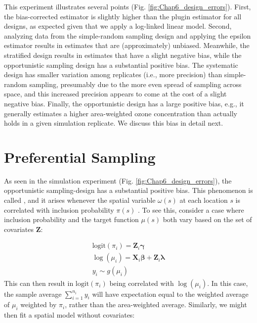 This experiment illustrates several points (Fig. \ref{fig:Chap6_design_errors}).  First, the bias-corrected estimator is slightly higher than the plugin estimator for all designs, as expected given that we apply a log-linked linear model.  Second, analyzing data from the simple-random sampling design and applying the epsilon estimator results in estimates that are (approximately) unbiased. Meanwhile, the stratified design results in estimates that have a slight negative bias, while the opportunistic sampling design has a substantial positive bias.  The systematic design has smaller variation among replicates (i.e., more precision) than simple-random sampling, presumably due to the more even spread of sampling across space, and this increased precision appears to come at the cost of a slight negative bias.   Finally, the opportunistic design has a large positive bias, e.g., it generally estimates a higher area-weighted ozone concentration than actually holds in a given simulation replicate.  We discuss this bias in detail next.  

\section{Preferential Sampling} \label{sec:Chap6_preferential_sampling}

As seen in the simulation experiment (Fig. \ref{fig:Chap6_design_errors}), the opportunistic sampling-design has a substantial positive bias.  This phenomenon is called , and it arises whenever the spatial variable \( \omega(s) \) at each location \(s\) is correlated with inclusion probability \( \pi(s) \) \cite{ conn_confronting_2017,diggle_model-based_2007}.  To see this, consider a case where inclusion probability and the target function \( \mu(s) \) both vary based on the set of covariates \(\mathbf Z\):

\begin{equation} \label{eq:Chap6_preferential_sampling}
\begin{gathered}
    \mathrm{logit}(\pi_i) = \mathbf Z_i \mathbf \gamma \\
    \log(\mu_i) = \mathbf X_i \mathbf \beta + \mathbf Z_i \mathbf \lambda \\
    y_i \sim g( \mu_i ) 
\end{gathered} 
\end{equation}
This can then result in \( \mathrm{logit}(\pi_i) \) being correlated with \( \log(\mu_i) \).  In this case, the sample average \( \sum_{i=1}^{n_i} y_i \) will have expectation equal to the weighted average of \( \mu_i \) weighted by \( \pi_i \), rather than the area-weighted average.  Similarly, we might then fit a spatial model without covariates:

